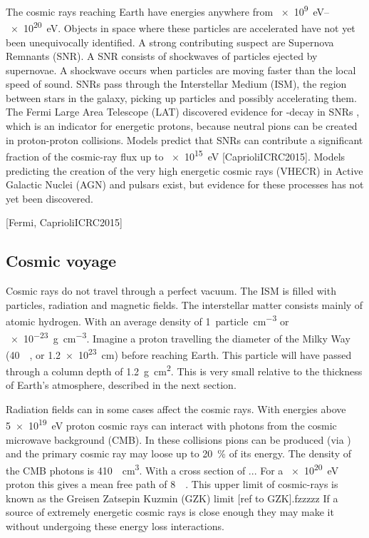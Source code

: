 The cosmic rays reaching Earth have energies anywhere from \SIrange{e9}{e20}{\eV}. Objects in space where these particles are accelerated have not yet been unequivocally identified. A strong contributing suspect are Supernova Remnants (SNR). A SNR consists of shockwaves of particles ejected by supernovae. A shockwave occurs when particles are moving faster than the local speed of sound. SNRs pass through the Interstellar Medium (ISM), the region between stars in the galaxy, picking up particles and possibly accelerating them. The Fermi Large Area Telescope (LAT) discovered evidence for \Pgpz-decay in SNRs \cite{ackermann2013snr}, which is an indicator for energetic protons, because neutral pions can be created in proton-proton collisions. Models predict that SNRs can contribute a significant fraction of the cosmic-ray flux up to \SI{e15}{\eV} [CaprioliICRC2015]. Models predicting the creation of the very high energetic cosmic rays (VHECR) in Active Galactic Nuclei (AGN) and pulsars exist, but evidence for these processes has not yet been discovered.

[Fermi, CaprioliICRC2015]

\subsection{Cosmic voyage}

Cosmic rays do not travel through a perfect vacuum. The ISM is filled with particles, radiation and magnetic fields. The interstellar matter consists mainly of atomic hydrogen. With an average density of \SI{1}{particle\per\centi\meter\cubed} or \SI{e-23}{\gram\per\centi\meter\cubed}. Imagine a proton travelling the diameter of the Milky Way (\SI{40}{\kilo\parsec}, or \SI{1.2e23}{\cm}) before reaching Earth. This particle will have passed through a column depth of \SI{1.2}{\gram\centi\meter\squared}. This is very small relative to the thickness of Earth's atmosphere, described in the next section.

Radiation fields can in some cases affect the cosmic rays. With energies above \SI{5e19}{\eV} proton cosmic rays can interact with photons from the cosmic microwave background (CMB). In these collisions pions can be produced (via \PDelta) and the primary cosmic ray may loose up to \SI{20}{\percent} of its energy. The density of the CMB photons is \SI{410}{\per\centi\meter\cubed}. With a cross section of ... For a \SI{e20}{\eV} proton this gives a mean free path of \SI{8}{\mega\parsec}. This upper limit of cosmic-rays is known as the Greisen Zatsepin Kuzmin (GZK) limit [ref to GZK].fzzzzz If a source of extremely energetic cosmic rays is close enough they may make it without undergoing these energy loss interactions.

